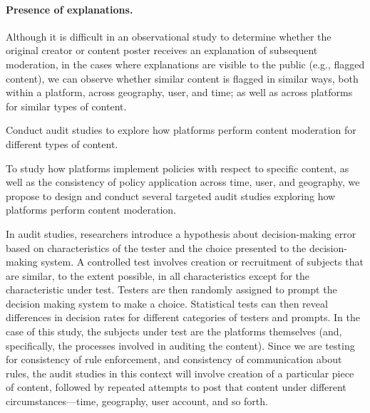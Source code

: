 \paragraph{Presence of explanations.} Although it is difficult in an
observational study to determine whether the original creator or content
poster receives an explanation of subsequent moderation, in the cases where
explanations are visible to the public (e.g., flagged content), we can
observe whether similar content is flagged in similar ways, both within a
platform, across geography, user, and time; as well as across platforms for
similar types of content.

\begin{task}
    Conduct audit studies to explore how platforms perform
    content moderation for different types of content.
\end{task}
\noindent
To study how platforms implement policies with respect to specific content, as
well as the consistency of policy application across time, user, and
geography, we propose to design and conduct several targeted audit studies
exploring how platforms perform content moderation.

In audit studies, researchers introduce a hypothesis about
decision-making error based on characteristics of the tester and the choice
presented to the decision-making system. A controlled test involves creation
or recruitment of subjects that are similar, to the extent possible, in all
characteristics except for the characteristic under test. Testers are then
randomly assigned to prompt the decision making system to make a choice.
Statistical tests can then reveal differences in decision rates for different
categories of testers and prompts. In the case of this study, the subjects
under test are the platforms themselves (and, specifically, the processes
involved in auditing the content). Since we are testing for consistency of
rule enforcement, and consistency of communication about rules, the audit
studies in this context will involve creation of a particular piece of
content, followed by repeated attempts to post that content under different
circumstances---time, geography, user account, and so forth.

